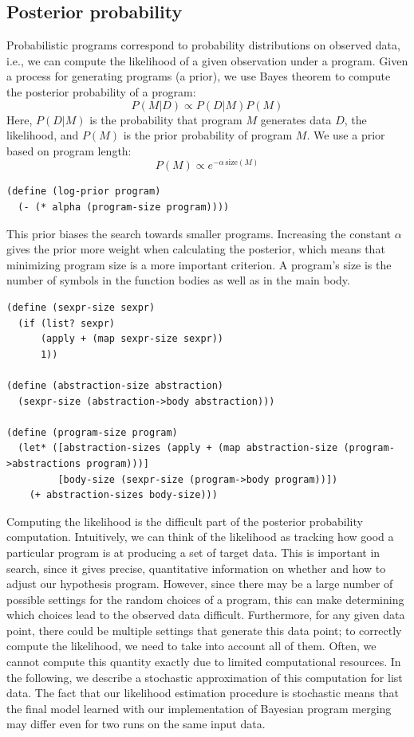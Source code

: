 \documentclass[a4paper,10pt]{article}
\begin{document}
\subsection{Posterior probability}

Probabilistic programs correspond to probability distributions on observed data, i.e., we can compute the likelihood of a given observation under a program. Given a process for generating programs (a prior), we use Bayes theorem to compute the posterior probability of a program:
\begin{equation}P(M|D)\propto P(D|M)P(M)\end{equation}
Here, $P(D|M)$ is the probability that program $M$ generates data $D$, the likelihood, and $P(M)$ is the prior probability of program $M$. We use a prior based on program length:
\begin{equation}P(M)\propto e^{-\alpha \, \mathrm{size}(M)}\end{equation}
\begin{lstlisting}[frame=trbl]
(define (log-prior program)
  (- (* alpha (program-size program))))
\end{lstlisting}
This prior biases the search towards smaller programs. Increasing the constant $\alpha$ gives the prior more weight when calculating the posterior, which means that minimizing program size is a more important criterion. A program's size is the number of symbols in the function bodies as well as in the main body.
\begin{lstlisting}[frame=trbl]
(define (sexpr-size sexpr)
  (if (list? sexpr)
      (apply + (map sexpr-size sexpr))
      1))

(define (abstraction-size abstraction)
  (sexpr-size (abstraction->body abstraction)))
  
(define (program-size program)
  (let* ([abstraction-sizes (apply + (map abstraction-size (program->abstractions program)))]
         [body-size (sexpr-size (program->body program))])
    (+ abstraction-sizes body-size)))
\end{lstlisting}
Computing the likelihood is the difficult part of the posterior probability computation. Intuitively, we can think of the likelihood as tracking how good a particular program is at producing a set of target data.  This is important in search, since it gives precise, quantitative information on whether and how to adjust our hypothesis program. However, since there may be a large number of possible settings for the random choices of a program, this can make determining which choices lead to the observed data difficult. Furthermore, for any given data point, there could be multiple settings that generate this data point; to correctly compute the likelihood, we need to take into account all of them. Often, we cannot compute this quantity exactly due to limited computational resources.  In the following, we describe a stochastic approximation of this computation for list data. The fact that our likelihood estimation procedure is stochastic means that the final model learned with our implementation of Bayesian program merging may differ even for two runs on the same input data.
\end{document}
